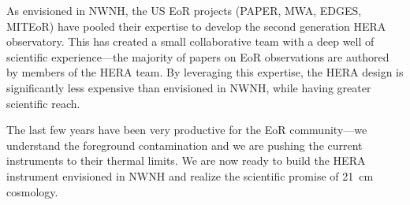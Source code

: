 \documentclass[preprint]{aastex}
\begin{document}
As envisioned in NWNH, the US EoR projects (PAPER, MWA, EDGES, MITEoR) have
pooled their expertise to develop the second generation HERA observatory. This
has created a small collaborative team with a deep well of scientific
experience---the majority of papers on EoR observations are authored by members
of the HERA team. By leveraging this expertise, the HERA design is significantly
less expensive than envisioned in NWNH, while having greater scientific reach.

The last few years have been very productive for the EoR community---we
understand the foreground contamination and we are pushing the current
instruments to their thermal limits. We are now ready to build the HERA
instrument envisioned in NWNH and realize the scientific promise of 21~cm
cosmology.

\clearpage
\setcounter{page}{1}
\thispagestyle{empty}
%
%

%

\end{document}
